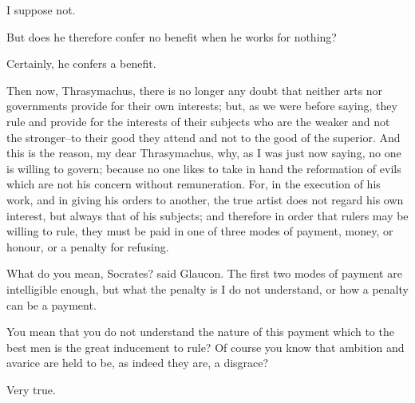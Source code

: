 I suppose not.

But does he therefore confer no benefit when he works for nothing?

Certainly, he confers a benefit.

Then now, Thrasymachus, there is no longer any doubt that neither arts
nor governments provide for their own interests; but, as we were before
saying, they rule and provide for the interests of their subjects who
are the weaker and not the stronger--to their good they attend and
not to the good of the superior. And this is the reason, my dear
Thrasymachus, why, as I was just now saying, no one is willing to
govern; because no one likes to take in hand the reformation of evils
which are not his concern without remuneration. For, in the execution of
his work, and in giving his orders to another, the true artist does not
regard his own interest, but always that of his subjects; and therefore
in order that rulers may be willing to rule, they must be paid in one of
three modes of payment, money, or honour, or a penalty for refusing.

What do you mean, Socrates? said Glaucon. The first two modes of payment
are intelligible enough, but what the penalty is I do not understand, or
how a penalty can be a payment.

You mean that you do not understand the nature of this payment which to
the best men is the great inducement to rule? Of course you know that
ambition and avarice are held to be, as indeed they are, a disgrace?

Very true.

